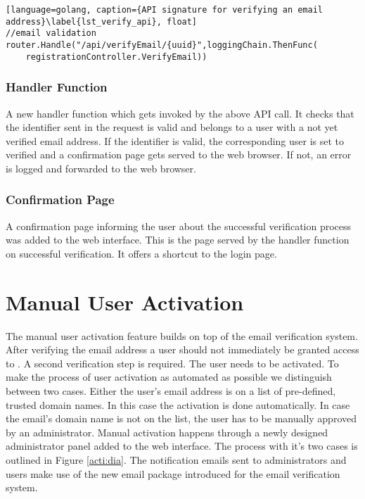 \begin{lstlisting}[language=golang, caption={API signature for verifying an email address}\label{lst_verify_api}, float]
//email validation
router.Handle("/api/verifyEmail/{uuid}",loggingChain.ThenFunc(
	registrationController.VerifyEmail))
\end{lstlisting}

\subsubsection{Handler Function}
A new handler function which gets invoked by the above API call. It checks that the identifier sent in the request is valid and belongs to a user with a not yet verified email address. If the identifier is valid, the corresponding user is set to verified and a confirmation page gets served to the web browser. If not, an error is logged and forwarded to the web browser.

\subsubsection{Confirmation Page}
A confirmation page informing the user about the successful verification process was added to the web interface. This is the page served by the handler function on successful verification. It offers a shortcut to the login page.

\section{Manual User Activation}
\label{impl_user_activation}
The manual user activation feature builds on top of the email verification system. After verifying the email address a user should not immediately be granted access to \lcs. A second verification step is required. The user needs to be activated. To make the process of user activation as automated as possible we distinguish between two cases. Either the user's email address is on a list of pre-defined, trusted domain names. In this case the activation is done automatically. In case the email's domain name is not on the list, the user has to be manually approved by an administrator. Manual activation happens through a newly designed administrator panel added to the web interface. The process with it's two cases is outlined in Figure \ref{acti:dia}. The notification emails sent to administrators and users make use of the new email package introduced for the email verification system.

